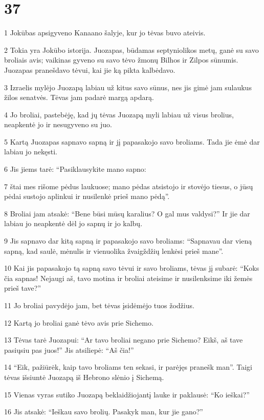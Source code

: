 \chapter{37}

\par 1 Jokūbas apsigyveno Kanaano šalyje, kur jo tėvas buvo ateivis. 
\par 2 Tokia yra Jokūbo istorija. Juozapas, būdamas septyniolikos metų, ganė su savo broliais avis; vaikinas gyveno su savo tėvo žmonų Bilhos ir Zilpos sūnumis. Juozapas pranešdavo tėvui, kai jie ką pikta kalbėdavo. 
\par 3 Izraelis mylėjo Juozapą labiau už kitus savo sūnus, nes jis gimė jam sulaukus žilos senatvės. Tėvas jam padarė margą apdarą. 
\par 4 Jo broliai, pastebėję, kad jų tėvas Juozapą myli labiau už visus brolius, neapkentė jo ir nesugyveno su juo. 
\par 5 Kartą Juozapas sapnavo sapną ir jį papasakojo savo broliams. Tada jie ėmė dar labiau jo nekęsti. 
\par 6 Jis jiems tarė: “Pasiklausykite mano sapno: 
\par 7 štai mes rišome pėdus laukuose; mano pėdas atsistojo ir stovėjo tiesus, o jūsų pėdai sustojo aplinkui ir nusilenkė prieš mano pėdą”. 
\par 8 Broliai jam atsakė: “Bene būsi mūsų karalius? O gal mus valdysi?” Ir jie dar labiau jo neapkentė dėl jo sapnų ir jo kalbų. 
\par 9 Jis sapnavo dar kitą sapną ir papasakojo savo broliams: “Sapnavau dar vieną sapną, kad saulė, mėnulis ir vienuolika žvaigždžių lenkėsi prieš mane”. 
\par 10 Kai jis papasakojo tą sapną savo tėvui ir savo broliams, tėvas jį subarė: “Koks čia sapnas! Nejaugi aš, tavo motina ir broliai ateisime ir nusilenksime iki žemės prieš tave?” 
\par 11 Jo broliai pavydėjo jam, bet tėvas įsidėmėjo tuos žodžius. 
\par 12 Kartą jo broliai ganė tėvo avis prie Sichemo. 
\par 13 Tėvas tarė Juozapui: “Ar tavo broliai negano prie Sichemo? Eikš, aš tave pasiųsiu pas juos!” Jis atsiliepė: “Aš čia!” 
\par 14 “Eik, pažiūrėk, kaip tavo broliams ten sekasi, ir parėjęs pranešk man”. Taigi tėvas išsiuntė Juozapą iš Hebrono slėnio į Sichemą. 
\par 15 Vienas vyras sutiko Juozapą beklaidžiojantį lauke ir paklausė: “Ko ieškai?” 
\par 16 Jis atsakė: “Ieškau savo brolių. Pasakyk man, kur jie gano?” 
